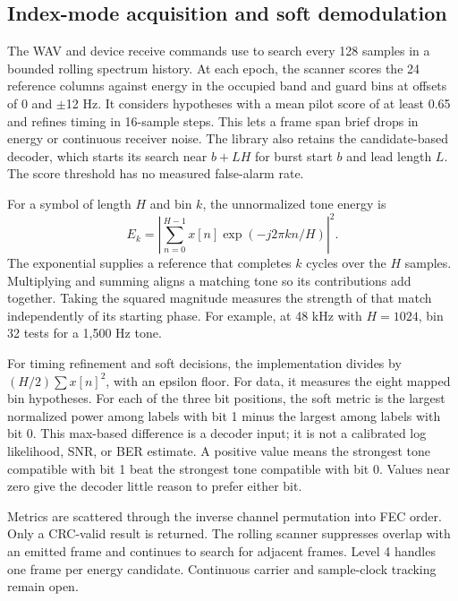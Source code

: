 
\subsection{Index-mode acquisition and soft demodulation}
The WAV and device receive commands use  to
search every 128 samples in a bounded rolling spectrum history. At each
epoch, the scanner scores the 24 reference columns against energy in
the occupied band and guard bins at offsets of 0 and $\pm$12 Hz. It
considers hypotheses with a mean pilot score of at least 0.65 and
refines timing in 16-sample steps. This lets a frame span brief drops in
energy or continuous receiver noise. The library also retains the
candidate-based decoder, which starts its search near $b+LH$ for burst
start $b$ and lead length $L$. The score threshold has no measured
false-alarm rate.

For a symbol of length $H$ and bin $k$, the unnormalized tone energy is
\[
 E_k=\left|\sum_{n=0}^{H-1}x[n]\exp(-j2\pi kn/H)\right|^2.
\]
The exponential supplies a reference that completes $k$ cycles over the
$H$ samples. Multiplying and summing aligns a matching tone so its
contributions add together. Taking the squared magnitude measures the
strength of that match independently of its starting phase. For example,
at 48 kHz with $H=1024$, bin 32 tests for a 1,500 Hz tone.

For timing refinement and soft decisions, the implementation divides by
$(H/2)\sum x[n]^2$, with an epsilon floor. For data, it measures the
eight mapped bin hypotheses. For each of the three bit positions, the soft
metric is the largest normalized power among labels with bit 1 minus the
largest among labels with bit 0. This max-based difference is a decoder input;
it is not a calibrated log likelihood, SNR, or BER estimate.
A positive value means the strongest tone compatible with bit 1 beat
the strongest tone compatible with bit 0. Values near zero give the
decoder little reason to prefer either bit.

Metrics are scattered through the inverse channel permutation into FEC order.
Only a CRC-valid result is returned. The rolling scanner suppresses overlap
with an emitted frame and continues to search for adjacent frames. Level 4
handles one frame per energy candidate. Continuous carrier and sample-clock
tracking remain open.

